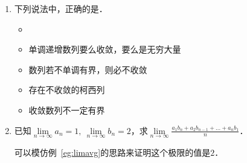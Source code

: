 \begin{enumerate}
    对选项~C的证明：
    \begin{proof}
      对于任意的\(0 < ε < a\)，因为数列\(\Seq{a_n}\)收敛于\(a\)，所以存在正偶数\(N_1\)使得当\(n > N_1\)时都有
      \begin{equation*}
        \sqrt[n]{\,c\,\mathstrut} \cdot \sqrt[n]{(a-ε)^{n-N_1}}
        < \sqrt[n]{\,a_1 a_2 \dotsm a_n \mathstrut}
        = \sqrt[n]{\,c\,\mathstrut} \cdot \sqrt[n]{\,\smash{a_{N_1+1} \dotsm a_n} \mathstrut}
        < \sqrt[n]{\,c\,\mathstrut} \cdot \sqrt[n]{(a+ε)^{n-N_1}},
      \end{equation*}
      其中\(c = a_1 a_2 \dotsm a_{N_1}\)．又因为
      \begin{gather*}
        \lim_{n\to\infty} \sqrt[n]{\,c\,\mathstrut} \cdot \sqrt[n]{(a-ε)^{n-N_1}} = \lim_{n\to\infty} (a-ε)^{1-N_1/n} = a-ε,\\
        \lim_{n\to\infty} \sqrt[n]{\,c\,\mathstrut} \cdot \sqrt[n]{(a+ε)^{n-N_1}} = \lim_{n\to\infty} (a+ε)^{1-N_1/n} = a+ε,\\
        \intertext{所以存在正整数\(N_2\)使得当\(n > N_2\)时都有}
        a - 2ε
        < \sqrt[n]{\,c\,\mathstrut} \cdot \sqrt[n]{(a-ε)^{n-N_1}}
        < \sqrt[n]{\,c\,\mathstrut} \cdot \sqrt[n]{(a+ε)^{n-N_1}}
        < a + 2ε.
      \end{gather*}
      此时，取\(N = \maxb*{\,N_1,\, N_2}\)，那么就有
      \begin{equation*}
        \abs*{\,\sqrt[n]{\,a_1 a_2 \dotsm a_n \mathstrut} - a\,} < 2ε.
        \qedhere
      \end{equation*}
      \begin{remark}
        其他的证明方法还有：利用AM-GM不等式和夹逼定理；取对数后利用例~\ref{eg:limavg}或者Stolz-Cesàro定理．
      \end{remark}
    \end{proof}
  \fi

\item 下列说法中，正确的是\uline{\makebox[10em]{}}．
  \begin{itemize}
    \renewcommand{\labelitemi}{\faCircleThin}
    \ifshowsol
    \item[\faCircle]
    \else
    \item
    \fi
    单调递增数列要么收敛，要么是无穷大量
  \item 数列若不单调有界，则必不收敛
  \item 存在不收敛的柯西列
  \item 收敛数列不一定有界
  \end{itemize}

\item 已知\(\lim\limits_{n\to\infty} a_n = 1,\ \lim\limits_{n\to\infty} b_n = 2\)，求\(\lim\limits_{n\to\infty} \frac{a_1 b_n + a_2 b_{n-1} + \dots + a_n b_1}{n}\)．

  \ifshowsol
    可以模仿例~\ref{eg:limavg}的思路来证明这个极限的值是\(2\)．
  \fi
\end{enumerate}
\fi

